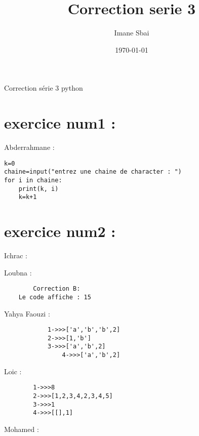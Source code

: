 \documentclass{article}
\title{Correction serie 3}
\author{Imane Sbai}
\date {\today}
\begin{document}
\begin{titlepage}
    \begin{center}
Correction s\'{e}rie 3 python
    \end{center}
\end{titlepage}

\section{exercice num1 :}
	\begin{center}
    		Abderrahmane :
	\end{center} 
	
\begin{lstlisting}
k=0
chaine=input("entrez une chaine de character : ")
for i in chaine:
	print(k, i)
	k=k+1
\end{lstlisting}
\section{exercice num2 :}

	\begin{center}
    		Ichrac :
	\end{center}
	
	
	\begin{center}
    		Loubna :
	\end{center} 
	\begin{verbatim}
		Correction B:
	Le code affiche : 15

	\end{verbatim}

        \begin{center}
    		 Yahya Faouzi :
	\end{center}    	  
        	
    	\begin{verbatim}
        	1->>>['a','b','b',2]
	    	2->>>[1,'b']
	    	3->>>['a','b',2]
                4->>>['a','b',2]

        \end{verbatim}
         
	\begin{center}
    		Loic :
	\end{center} 
	
	\begin{verbatim}
		1->>>8
		2->>>[1,2,3,4,2,3,4,5]
		3->>>1
		4->>>[[],1]
	\end{verbatim}
	
	\begin{center}
    		Mohamed :
	\end{center}
	
\end{document}
